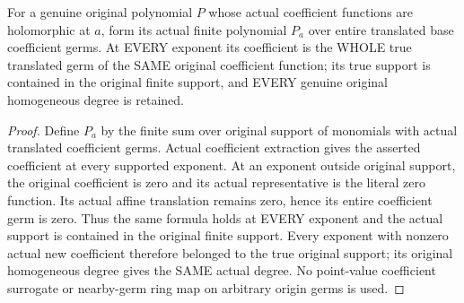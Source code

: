 \begin{lemma}
\label{hir:relative-normal-nearby-entire-polynomial-coefficient-germs}
\leanok
For a genuine original polynomial $P$ whose actual coefficient functions are holomorphic at $a$, form its actual finite polynomial $P_a$ over entire translated base coefficient germs. At EVERY exponent its coefficient is the WHOLE true translated germ of the SAME original coefficient function; its true support is contained in the original finite support, and EVERY genuine original homogeneous degree is retained.
\end{lemma}
\begin{proof}
Define $P_a$ by the finite sum over original support of monomials with actual translated coefficient germs. Actual coefficient extraction gives the asserted coefficient at every supported exponent. At an exponent outside original support, the original coefficient is zero and its actual representative is the literal zero function. Its actual affine translation remains zero, hence its entire coefficient germ is zero. Thus the same formula holds at EVERY exponent and the actual support is contained in the original finite support. Every exponent with nonzero actual new coefficient therefore belonged to the true original support; its original homogeneous degree gives the SAME actual degree. No point-value coefficient surrogate or nearby-germ ring map on arbitrary origin germs is used.
\end{proof}

